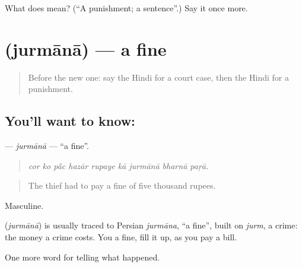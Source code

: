 \begin{tcolorbox}[breakable,colback=teal!4,colframe=teal!35!black,title={Before you move on}]
What does  mean? (\textquotedblleft{}A punishment; a sentence\textquotedblright{}.) Say it once more.
\end{tcolorbox}
\section[\texorpdfstring{\hi{जुर्माना} (jurmānā)}{जुर्माना (jurmānā)}]{ (jurmānā) — a fine}

\label{lesson:HI-C295-jurmana}



\begin{quote}
Before the new one: say the Hindi for a court case, then the Hindi for a punishment.
\end{quote}

\subsection*{You'll want to know: }
\textbf{} — \emph{jurmānā} — \textquotedblleft{}a fine\textquotedblright{}.

\begin{quote}
        
\end{quote}

\begin{quote}
\emph{cor ko pā̃c hazār rupaye kā jurmānā bharnā paṛā.}
\end{quote}

\begin{quote}
The thief had to pay a fine of five thousand rupees.
\end{quote}

Masculine.

\begin{cousinweb}
\textbf{} (\emph{jurmānā}) is usually traced to Persian \emph{jurmāna}, \textquotedblleft{}a fine\textquotedblright{}, built on \emph{jurm}, a crime: the money a crime costs. You \textbf{} a fine, fill it up, as you pay a bill.
\end{cousinweb}

\begin{grammarlens}[title={What you've built}]
One more word for telling what happened.
\end{grammarlens}

